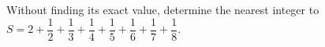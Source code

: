 Without finding its exact value, determine the nearest integer to $S=2+\dfrac{1}{2}+\dfrac{1}{3}+\dfrac{1}{4}+\dfrac{1}{5}+\dfrac{1}{6}+\dfrac{1}{7}+\dfrac{1}{8}$.
